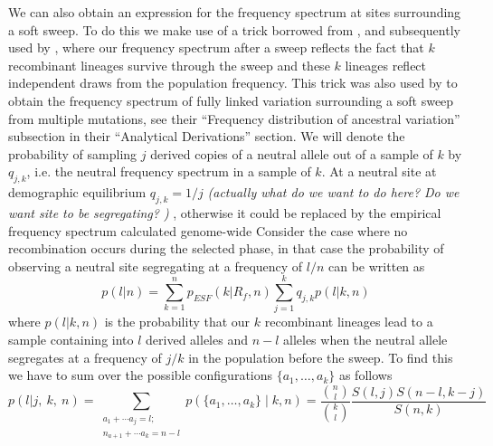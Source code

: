 \documentclass[a4paper,10pt]{article}
\newcommand{\gc}[1]{{\it \color{red} (#1)} }
\begin{document}
We can also obtain an expression for the frequency spectrum at sites surrounding a soft sweep. To do this we make use of a trick borrowed from \cite{Kimandstephan}, and subsequently used by \cite{NielsenKimetc}, where our frequency spectrum after a sweep reflects the fact that $k$ recombinant lineages survive through the sweep and these $k$ lineages reflect independent draws from the population frequency. This trick was also used by \citep{PenningandHermisson} to obtain the frequency spectrum of fully linked variation surrounding a soft sweep from multiple mutations, see their ``Frequency distribution of ancestral variation'' subsection in their ``Analytical Derivations'' section. We will denote the probability of sampling $j$ derived copies of a neutral allele out of a sample of $k$ by $q_{j,k}$, i.e. the neutral frequency spectrum in a sample of $k$. At a neutral site at demographic equilibrium $q_{j,k} = 1/j$ \gc{actually what do we want to do here? Do we want site to be segregating? }, otherwise it could be replaced by the empirical frequency spectrum calculated genome-wide \citep[as in ][]{NielsenKimetc}
Consider the case where no recombination occurs during the selected phase, in that case the probability of observing a neutral site segregating at a frequency of $l/n$ can be written as
\begin{equation}
p(l | n) =  \sum_{k=1}^{n}  p_{ESF}(k | R_f,n)  \sum_{j=1}^{k} q_{j,k}  p(l | k,n) 
\end{equation}
where $  p(l | k,n) $ is the probability that our $k$ recombinant lineages lead to a sample containing into $l$ derived alleles and $n-l$ alleles when the neutral allele segregates at a frequency of $j/k$ in the population before the sweep. To find this we have to sum over the possible configurations $\{a_1,\dots,a_k\}$ as follows
\begin{equation}
p(l | j, ~k,~n) = 
\sum_{\substack{a_1+\cdots a_j=l;\\
    n_{a+1}+\cdots a_k=n-l}} 
p(\{a_1,\dots,a_k\} \mid k, n) = \frac{ {n \choose l} }{ {k \choose l} }\frac{ S(l,j)  S(n-l,k-j)  }{ S(n,k) } \label{ESF_gives_freq_spec}
\end{equation}
\end{document}
